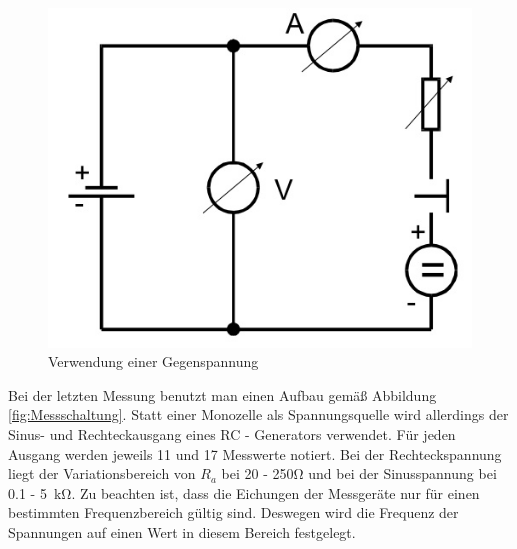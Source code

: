 \begin{figure}
\center
\includegraphics[scale=0.3]{Aufbau_c.jpg}
\caption{Verwendung einer Gegenspannung}
\label{fig:Messschaltung2}
\end{figure}

Bei der letzten Messung benutzt man einen Aufbau gemäß Abbildung \ref{fig:Messschaltung}.
Statt einer Monozelle als Spannungsquelle wird allerdings der Sinus- und 
Rechteckausgang eines RC - Generators verwendet. 
Für jeden Ausgang werden jeweils 11 und 17 Messwerte notiert. Bei der 
Rechteckspannung liegt der Variationsbereich von $R_a$ bei 20 - 250\si{\ohm} 
und bei der Sinusspannung bei 0.1 - \SI{5}{\kilo\ohm}.
Zu beachten ist, dass die Eichungen der Messgeräte nur für einen bestimmten 
Frequenzbereich gültig sind. Deswegen wird die Frequenz der Spannungen auf
einen Wert in diesem Bereich festgelegt.

\label{sec:Durchführung}
